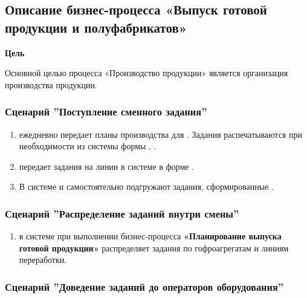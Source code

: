 \newpage
\subsection{Описание бизнес-процесса «Выпуск готовой продукции и полуфабрикатов»}
\label{bp:production}


\textbf{Цель}

Основной целью процесса «Производство продукции» является организация производства продукции.

\subsubsection{Сценарий ''Поступление сменного задания''}
\label{bp:production_1}

\begin{enumerate}

\item 	\planner ежедневно  передает планы производства для \master. Задания распечатываются при необходимости из системы \gofro формы , .
\item 	\planner передает задания на линии в системе \gofro в форме .
\item В системе \gofro \operator и \gaoperator самостоятельно подгружают задания, сформированные \planner.
\end{enumerate}


\subsubsection{Сценарий ''Распределение заданий внутри смены''}
\label{bp:production_2}

\begin{enumerate}

\item 	\planner  в системе \gofro при выполнении бизнес-процесса \textbf{«Планирование выпуска готовой продукции»} распределяет задания по гофроагрегатам и линиям переработки.
\end{enumerate}



\subsubsection{Сценарий ''Доведение заданий до операторов оборудования''}
\label{bp:production_3}

